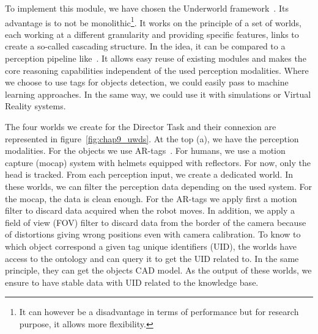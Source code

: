 To implement this module, we have chosen the Underworld framework~\cite{lemaignan_2018_underworlds}. Its advantage is to not be monolithic\footnote{It can however be a disadvantage in terms of performance but for research purpose, it allows more flexibility.}. It works on the principle of a set of worlds, each working at a different granularity and providing specific features, links to create a so-called cascading structure. In the idea, it can be compared to a perception pipeline like~\cite{beetz_2015_robosherlock}. It allows easy reuse of existing modules and makes the core reasoning capabilities independent of the used perception modalities. Where we choose to use tags for objects detection, we could easily pass to machine learning approaches. In the same way, we could use it with simulations or Virtual Reality systems.

The four worlds we create for the Director Task and their connexion are represented in figure~\ref{fig:chap9_uwds}. At the top (a), we have the perception modalities. For the objects we use AR-tags~\cite{fiala_2005_artag}. For humans, we use a motion capture (mocap) system with helmets equipped with reflectors. For now, only the head is tracked. From each perception input, we create a dedicated world. In these worlds, we can filter the perception data depending on the used system. For the mocap, the data is clean enough. For the AR-tags we apply first a motion filter to discard data acquired when the robot moves. In addition, we apply a field of view (FOV) filter to discard data from the border of the camera because of distortions giving wrong positions even with camera calibration. To know to which object correspond a given tag unique identifiers (UID), the worlds have access to the ontology and can query it to get the UID related to. In the same principle, they can get the objects CAD model. As the output of these worlds, we ensure to have stable data with UID related to the knowledge base.

